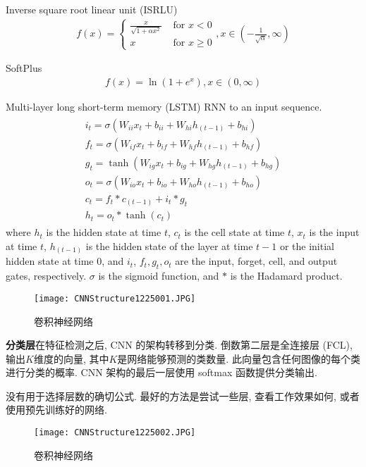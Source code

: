 Inverse square root linear unit (ISRLU) \cite{BradCarlile2017}
\begin{align}
f(x)=\left\{\begin{array}{ll}
{\frac{x}{\sqrt{1+\alpha x^{2}}}} & {\text { for } x<0} \\
{x} & {\text { for } x \geq 0}
\end{array}\right., x\in \left(-\frac{1}{\sqrt{\alpha}}, \infty\right)  
\end{align}

SoftPlus \cite{glorot2011}
\begin{align}
  f(x)=\ln \left(1+e^{x}\right), x\in (0, \infty)
\end{align}

Multi-layer long short-term memory (LSTM) RNN to an input sequence.
\begin{align}
\begin{array}{l}
{i_{t}=\sigma\left(W_{i i} x_{t}+b_{i i}+W_{h i} h_{(t-1)}+b_{h i}\right)} \\
{f_{t}=\sigma\left(W_{i f} x_{t}+b_{i f}+W_{h f} h_{(t-1)}+b_{h f}\right)} \\
{g_{t}=\tanh \left(W_{i g} x_{t}+b_{i g}+W_{h g} h_{(t-1)}+b_{h g}\right)} \\
{o_{t}=\sigma\left(W_{i o} x_{t}+b_{i o}+W_{h o} h_{(t-1)}+b_{h o}\right)} \\
{c_{t}=f_{t} * c_{(t-1)}+i_{t} * g_{t}} \\
{h_{t}=o_{t} * \tanh \left(c_{t}\right)}
\end{array}
\end{align}
where $h_t$ is the hidden state at time $t$, $c_t$ is the cell state at time $t$, $x_t$ is the input at time $t$, $h_{(t-1)}$ is the hidden state of the layer at time $t-1$ or the initial hidden state at time 0,
and $i_t$, $f_t, g_t, o_t$ are the input, forget, cell, and output gates, respectively. $\sigma$ is the sigmoid function, and $*$ is the Hadamard product.
\begin{figure}[H]
\centering
\texttt{[image: CNNStructure1225001.JPG]}
\caption{卷积神经网络}
\label{CNNStructure1225001}
\end{figure}

\textbf{分类层}在特征检测之后, CNN 的架构转移到分类. 倒数第二层是全连接层 (FCL), 输出$K$维度的向量, 其中$K$是网络能够预测的类数量. 此向量包含任何图像的每个类进行分类的概率. CNN 架构的最后一层使用 softmax 函数提供分类输出.

没有用于选择层数的确切公式. 最好的方法是尝试一些层, 查看工作效果如何, 或者使用预先训练好的网络.
\begin{figure}[H]
\centering
\texttt{[image: CNNStructure1225002.JPG]}
\caption{卷积神经网络}
\label{CNNStructure1225002}
\end{figure}

